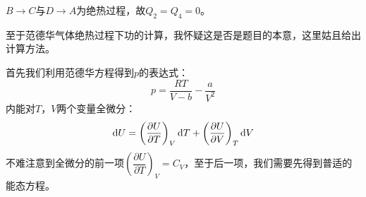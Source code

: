 \begin{solution}
        $B\rightarrow C$与$D\rightarrow A$为绝热过程，故$Q_2 = Q_4 = 0$。

        至于范德华气体绝热过程下功的计算，我怀疑这是否是题目的本意，这里姑且给出计算方法。

        首先我们利用范德华方程得到$p$的表达式：
        \begin{equation*}
            p = \frac{RT}{V - b} - \frac{a}{V^2}
        \end{equation*}
        内能对$T$，$V$两个变量全微分：
        \begin{equation*}
            \mathrm{d} U = \left(\frac{\partial U}{\partial T}\right)_{V} \mathrm{d} T + \left(\frac{\partial U}{\partial V}\right)_{T} \mathrm{d} V
        \end{equation*}
        不难注意到全微分的前一项$\left(\dfrac{\partial U}{\partial T}\right)_{V} = C_{V}$，至于后一项，我们需要先得到普适的能态方程。


\end{solution}
